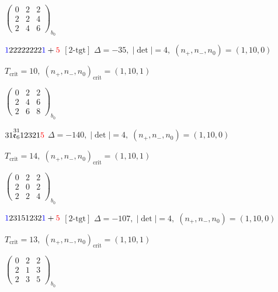 \documentclass[10pt]{article}
\begin{document}
\hspace{2em}$\left(\begin{smallmatrix}0 & 2 & 2 \\ 2 & 2 & 4 \\ 2 & 4 & 6\end{smallmatrix}\right)_{\!b_0}$

\smallskip

$\textcolor{blue}{1}22222222\textcolor{blue}{1}+\textcolor{red}{5}$ $\scriptstyle [2\text{-tgt}]$ \quad $\Delta=-35,\; |\det|=4,\; (n_+,n_-,n_0)=(1,10,0)$

\hspace{1em}$T_{\text{crit}}=10,\; (n_+,n_-,n_0)_{\text{crit}}=(1,10,1)$

\hspace{2em}$\left(\begin{smallmatrix}0 & 2 & 2 \\ 2 & 4 & 6 \\ 2 & 6 & 8\end{smallmatrix}\right)_{\!b_0}$

\smallskip

$31\overset{31}{\mathfrak{e}_6}12321\textcolor{red}{5}$ \quad $\Delta=-140,\; |\det|=4,\; (n_+,n_-,n_0)=(1,10,0)$

\hspace{1em}$T_{\text{crit}}=14,\; (n_+,n_-,n_0)_{\text{crit}}=(1,10,1)$

\hspace{2em}$\left(\begin{smallmatrix}0 & 2 & 2 \\ 2 & 0 & 2 \\ 2 & 2 & 4\end{smallmatrix}\right)_{\!b_0}$

\smallskip

$\textcolor{blue}{1}23151232\textcolor{blue}{1}+\textcolor{red}{5}$ $\scriptstyle [2\text{-tgt}]$ \quad $\Delta=-107,\; |\det|=4,\; (n_+,n_-,n_0)=(1,10,0)$

\hspace{1em}$T_{\text{crit}}=13,\; (n_+,n_-,n_0)_{\text{crit}}=(1,10,1)$

\hspace{2em}$\left(\begin{smallmatrix}0 & 2 & 2 \\ 2 & 1 & 3 \\ 2 & 3 & 5\end{smallmatrix}\right)_{\!b_0}$
\end{document}
